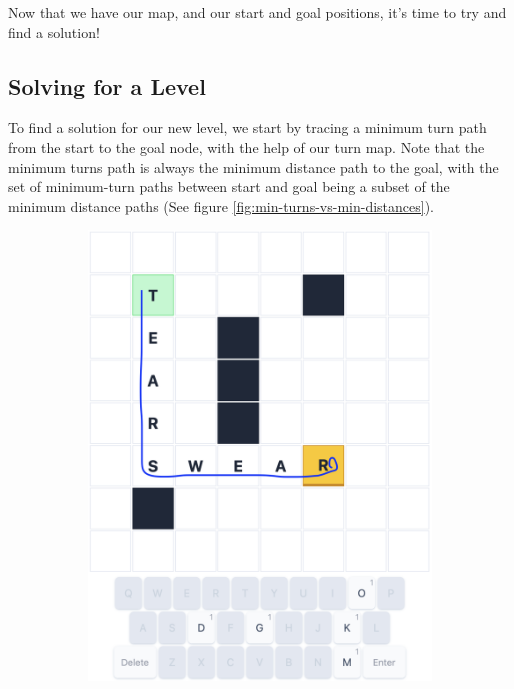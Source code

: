 \documentclass{article}
\begin{document}
Now that we have our map, and our start and goal positions, it's time to try 
and find a solution!

\subsection{Solving for a Level}
To find a solution for our new level, we start by tracing a minimum turn path 
from the start to the goal node, with the help of our turn map. Note that 
the minimum turns path is always the minimum distance path to the goal, 
with the set of minimum-turn paths between start and goal 
being a subset of the minimum distance
paths (See figure \ref{fig:min-turns-vs-min-distances}).

\begin{figure}
\centering
\begin{subfigure}{0.5\textwidth}
  \centering
  \includegraphics[width=0.8\linewidth]{min-turns.png}
\end{subfigure}%
\begin{subfigure}{0.5\textwidth}
  \centering

\end{subfigure}
\end{figure}
\end{document}
